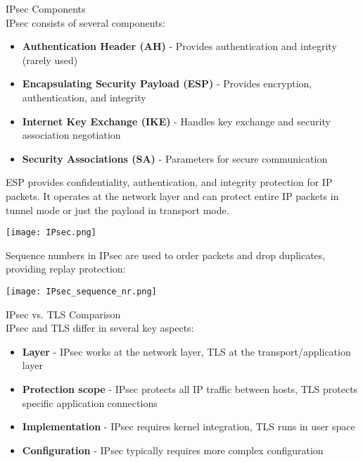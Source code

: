 \begin{concept}{IPsec Components}\\
IPsec consists of several components:
\begin{itemize}
    \item \textbf{Authentication Header (AH)} - Provides authentication and integrity (rarely used)
    \item \textbf{Encapsulating Security Payload (ESP)} - Provides encryption, authentication, and integrity
    \item \textbf{Internet Key Exchange (IKE)} - Handles key exchange and security association negotiation
    \item \textbf{Security Associations (SA)} - Parameters for secure communication
\end{itemize}

ESP provides confidentiality, authentication, and integrity protection for IP packets. It operates at the network layer and can protect entire IP packets in tunnel mode or just the payload in transport mode.

\texttt{[image: IPsec.png]}

Sequence numbers in IPsec are used to order packets and drop duplicates, providing replay protection:

\texttt{[image: IPsec\_sequence\_nr.png]}
\end{concept}

\begin{theorem}{IPsec vs. TLS Comparison}\\
IPsec and TLS differ in several key aspects:
\begin{itemize}
    \item \textbf{Layer} - IPsec works at the network layer, TLS at the transport/application layer
    \item \textbf{Protection scope} - IPsec protects all IP traffic between hosts, TLS protects specific application connections
    \item \textbf{Implementation} - IPsec requires kernel integration, TLS runs in user space
    \item \textbf{Configuration} - IPsec typically requires more complex configuration
\end{itemize}
\end{theorem}

